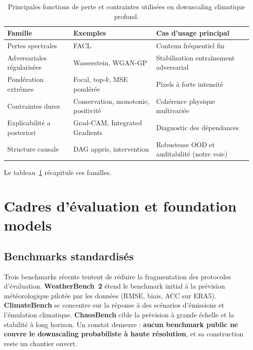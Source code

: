 \documentclass[14pt,a4paper,openany]{extreport}
\begin{document}
\begin{table}[ht]
  \centering
  \footnotesize
  \caption[Fonctions de perte]{Principales fonctions de perte et contraintes utilisées en downscaling climatique profond.}
  \label{tab:pertes}
  \begin{tabular}{p{3cm} p{3.5cm} p{5.5cm}}
    \toprule
    \textbf{Famille} & \textbf{Exemples} & \textbf{Cas d'usage principal} \\
    \midrule
    Pertes spectrales & FACL & Contenu fréquentiel fin\\
    Adversariales régularisées & Wasserstein, WGAN-GP & Stabilisation entraînement adversarial\\
    Pondération extrêmes & Focal, top-$k$, MSE pondérée & Pixels à forte intensité\\
    Contraintes dures & Conservation, monotonie, positivité & Cohérence physique multivariée\\
    Explicabilité a posteriori & Grad-CAM, Integrated Gradients & Diagnostic des dépendances\\
    Structure causale & DAG appris, intervention & Robustesse OOD et auditabilité (notre voie)\\
    \bottomrule
  \end{tabular}
\end{table}

Le tableau~\ref{tab:pertes} récapitule ces familles.

\section{Cadres d'évaluation et foundation models}
\label{sec:soa-benchmarks}

\subsection{Benchmarks standardisés}
\label{ssec:soa-benchmarks-std}

Trois benchmarks récents tentent de réduire la fragmentation des protocoles d'évaluation. \textbf{WeatherBench~2} étend le benchmark initial à la prévision météorologique pilotée par les données (RMSE, biais, ACC sur ERA5). \textbf{ClimateBench} se concentre sur la réponse à des scénarios d'émissions et l'émulation climatique. \textbf{ChaosBench} cible la prévision à grande échelle et la stabilité à long horizon. Un constat demeure : \textbf{aucun benchmark public ne couvre le downscaling probabiliste à haute résolution}, et sa construction reste un chantier ouvert.
\end{document}
